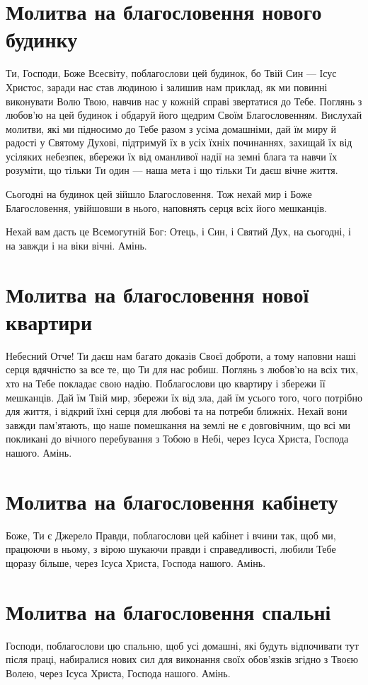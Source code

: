 \documentclass[chapters.tex]{subfiles}
\begin{document}
\section{Молитва на благословення нового будинку}
Ти, Господи, Боже Всесвіту, поблагослови цей будинок, бо Твій Син — Ісус Христос, заради нас став людиною і залишив нам приклад, як ми повинні виконувати Волю Твою, навчив нас у кожній справі звертатися до Тебе. Поглянь з любов’ю на цей будинок і обдаруй його щедрим Своїм Благословенням. Вислухай молитви, які ми підносимо до Тебе разом з усіма домашніми, дай їм миру й радості у Святому Духові, підтримуй їх в усіх їхніх починаннях, захищай їх від усіляких небезпек, вбережи їх від оманливої надії на земні блага та навчи їх розуміти, що тільки Ти один — наша мета і що тільки Ти даєш вічне життя.

Сьогодні на будинок цей зійшло Благословення. Тож нехай мир і Боже Благословення, увійшовши в нього, наповнять серця всіх його мешканців.

Нехай вам дасть це Всемогутній Бог: Отець, і Син, і Святий Дух, на сьогодні, і на завжди і на віки вічні. Амінь.

\section{Молитва на благословення нової квартири}
Небесний Отче! Ти даєш нам багато доказів Своєї доброти, а тому наповни наші серця вдячністю за все те, що Ти для нас робиш. Поглянь з любов’ю на всіх тих, хто на Тебе покладає свою надію. Поблагослови цю квартиру і збережи її мешканців. Дай їм Твій мир, збережи їх від зла, дай їм усього того, чого потрібно для життя, і відкрий їхні серця для любові та на потреби ближніх. Нехай вони завжди пам’ятають, що наше помешкання на землі не є довговічним, що всі ми покликані до вічного перебування з Тобою в Небі, через Ісуса Христа, Господа нашого. Амінь.

\section{Молитва на благословення кабінету}
Боже, Ти є Джерело Правди, поблагослови цей кабінет і вчини так, щоб ми, працюючи в ньому, з вірою шукаючи правди і справедливості, любили Тебе щоразу більше, через Ісуса Христа, Господа нашого. Амінь.

\section{Молитва на благословення спальні}
Господи, поблагослови цю спальню, щоб усі домашні, які будуть відпочивати тут після праці, набиралися нових сил для виконання своїх обов’язків згідно з Твоєю Волею, через Ісуса Христа, Господа нашого. Амінь.
\end{document}
